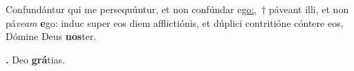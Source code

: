 
Confundántur qui me persequúntur, et non confúndar e\underline{go:},~† páveant illi, et non pá\textit{veam} \textbf{e}go: induc super eos diem afflictiónis, et dúplici contritióne cóntere eos, Dómine Deus \textbf{nos}ter.

\textbf{\Rbar.} Deo \textbf{grá}tias.

